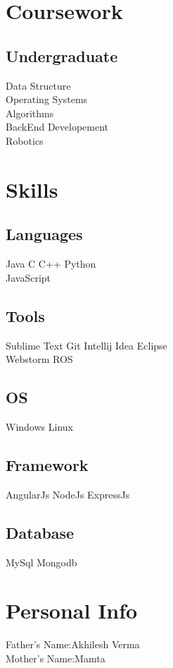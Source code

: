 \documentclass[]{resume}
\begin{document}
\begin{minipage}[t]{0.33\textwidth}

\section{Coursework}

\subsection{Undergraduate}
Data Structure\\
Operating Systems \\
Algorithms \\
BackEnd Developement \\
Robotics \\
\sectionsep


\section{Skills}
\subsection{Languages}
Java \textbullet{}   C \textbullet{} C++ \textbullet{} Python \\
JavaScript
\subsection{Tools}
Sublime Text \textbullet{} Git \textbullet{} Intellij Idea \textbullet{} Eclipse  \\
Webstorm \textbullet{} ROS
\subsection{OS}
Windows \textbullet{} Linux
\subsection{Framework}
AngularJs \textbullet{} NodeJs \textbullet{} ExpressJs \textbullet{}
\subsection{Database}
MySql \textbullet{} Mongodb \textbullet{} 
\sectionsep

\section{Personal Info}
Father's Name:Akhilesh Verma\\
Mother's Name:Mamta\\

%
%

\end{minipage} 
\end{document}
